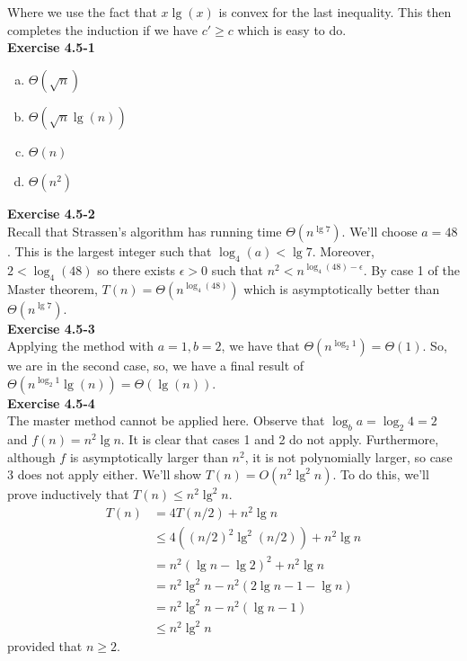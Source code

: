 \documentclass{article}
\begin{document}
Where we use the fact that $x\lg(x)$ is convex for the last inequality. This then completes the induction if we have $c' \ge c$ which is easy to do.\\

\noindent\textbf{Exercise 4.5-1}\\

\begin{enumerate}[a.]
\item
$\Theta(\sqrt{n})$
\item
$\Theta(\sqrt{n}\lg(n))$
\item
$\Theta(n)$
\item
$\Theta(n^2)$
\end{enumerate}

\noindent\textbf{Exercise 4.5-2}\\

Recall that Strassen's algorithm has running time $\Theta(n^{\lg 7})$.  We'll choose $a = 48$.  This is the largest integer such that $\log_4(a) < \lg 7$.  Moreover, $2 < \log_4(48)$ so there exists $\epsilon > 0$ such that $n^2 < n^{\log_4(48) - \epsilon}$.  By case 1 of the Master theorem, $T(n) = \Theta(n^{\log_4(48)})$ which is asymptotically better than $\Theta(n^{\lg 7})$. \\

\noindent\textbf{Exercise 4.5-3}\\

Applying the method with $a=1,b=2$, we have that $\Theta(n^{\log_2 1}) = \Theta(1)$. So, we are in the second case, so, we have a final result of $\Theta(n^{\log_2 1}\lg(n)) = \Theta(\lg(n))$.\\

\noindent\textbf{Exercise 4.5-4}\\

The master method cannot be applied here.  Observe that $\log_b a = \log_2 4 = 2$ and $f(n) = n^2 \lg n$.  It is clear that cases 1 and 2 do not apply.  Furthermore, although $f$ is asymptotically larger than $n^2$, it is not polynomially larger, so case 3 does not apply either.  We'll show $T(n) = O(n^2\lg^2 n)$.  To do this, we'll prove inductively that $T(n) \leq n^2\lg^2 n$.  
\begin{align*}
T(n) & = 4T(n/2)+n^2\lg n \\
& \leq 4((n/2)^2\lg^2(n/2)) + n^2 \lg n \\
&= n^2(\lg n - \lg 2)^2 + n^2 \lg n \\
&= n^2\lg^2 n - n^2(2\lg n - 1 - \lg n) \\
&= n^2\lg^2 n - n^2(\lg n - 1) \\
&\leq n^2\lg^2 n
\end{align*}
provided that $n \geq 2$.  \\
\end{document}
